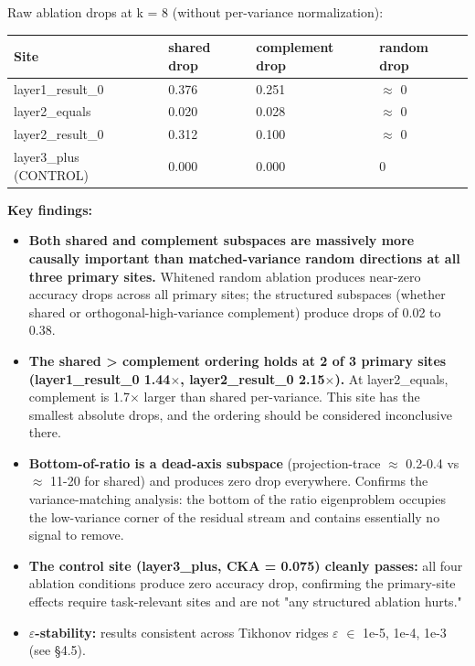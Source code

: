 Raw ablation drops at k = 8 (without per-variance normalization):

\begin{center}
\begin{tabular}{|l|l|l|l|}
\hline
\textbf{Site} & \textbf{shared drop} & \textbf{complement drop} & \textbf{random drop} \\
\hline
layer1\_result\_0 & 0.376 & 0.251 & $\approx$ 0 \\
layer2\_equals & 0.020 & 0.028 & $\approx$ 0 \\
layer2\_result\_0 & 0.312 & 0.100 & $\approx$ 0 \\
layer3\_plus (CONTROL) & 0.000 & 0.000 & 0 \\
\hline
\end{tabular}
\end{center}


\textbf{Key findings:}

\begin{itemize}
  \item \textbf{Both shared and complement subspaces are massively more causally important than matched-variance random directions at all three primary sites.} Whitened random ablation produces near-zero accuracy drops across all primary sites; the structured subspaces (whether shared or orthogonal-high-variance complement) produce drops of 0.02 to 0.38.
  \item \textbf{The shared > complement ordering holds at 2 of 3 primary sites (layer1\_result\_0 1.44$\times$, layer2\_result\_0 2.15$\times$).} At layer2\_equals, complement is 1.7$\times$ larger than shared per-variance. This site has the smallest absolute drops, and the ordering should be considered inconclusive there.
  \item \textbf{Bottom-of-ratio is a dead-axis subspace} (projection-trace $\approx$ 0.2-0.4 vs $\approx$ 11-20 for shared) and produces zero drop everywhere. Confirms the variance-matching analysis: the bottom of the ratio eigenproblem occupies the low-variance corner of the residual stream and contains essentially no signal to remove.
  \item \textbf{The control site (layer3\_plus, CKA = 0.075) cleanly passes:} all four ablation conditions produce zero accuracy drop, confirming the primary-site effects require task-relevant sites and are not "any structured ablation hurts."
  \item \textbf{$\varepsilon$-stability:} results consistent across Tikhonov ridges $\varepsilon$ $\in$ {1e-5, 1e-4, 1e-3} (see \S{}4.5).
\end{itemize}

